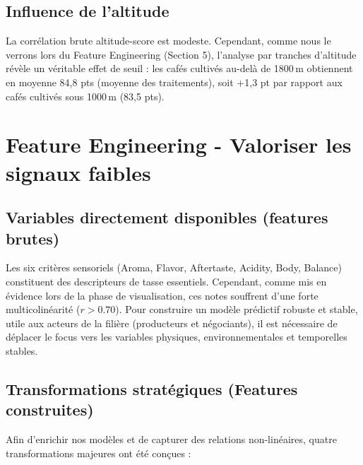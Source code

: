\documentclass[12pt,a4paper]{article}
\begin{document}
\subsection{Influence de l'altitude}
La corrélation brute altitude-score est modeste. Cependant, comme nous le verrons lors du Feature Engineering (Section 5), l'analyse par tranches d'altitude révèle un véritable effet de seuil : les cafés cultivés au-delà de 1800\,m obtiennent en moyenne 84,8 pts (moyenne des traitements), soit +1,3 pt par rapport aux cafés cultivés sous 1000\,m (83,5 pts).

\section{Feature Engineering - Valoriser les signaux faibles}

\subsection{Variables directement disponibles (features brutes)}

Les six critères sensoriels (Aroma, Flavor, Aftertaste, Acidity, Body, Balance) constituent des descripteurs de tasse essentiels. Cependant, comme mis en évidence lors de la phase de visualisation, ces notes souffrent d'une forte multicolinéarité ($r > 0.70$). Pour construire un modèle prédictif robuste et stable, utile aux acteurs de la filière (producteurs et négociants), il est nécessaire de déplacer le focus vers les variables physiques, environnementales et temporelles stables.

\subsection{Transformations stratégiques (Features construites)}

Afin d'enrichir nos modèles et de capturer des relations non-linéaires, quatre transformations majeures ont été conçues :
\end{document}
